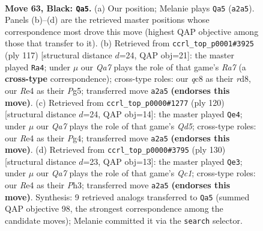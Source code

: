\documentclass[11pt]{article}
\begin{document}
\clearpage

\begin{figure}[p]\centering
\begin{subfigure}{0.46\textwidth}\centering
\resizebox{\linewidth}{!}{%
\newchessgame
\chessboard[
  setfen={2Q5/8/5pk1/3p4/4r3/6PK/q6P/8 b - - 7 63},
  showmover=false,
  pgfstyle=straightmove, color=movearrow, markmove={a2-a5}
]}
\caption{}
\end{subfigure}\hfill
\begin{subfigure}{0.46\textwidth}\centering
\resizebox{\linewidth}{!}{%
\newchessgame
\chessboard[
  setfen={3R4/8/6k1/p5p1/8/5PK1/r5P1/8 b - - 21 59},
  showmover=false,
  pgfstyle=straightmove, color=movearrow, markmove={a2-a4}
]}
\caption{}
\end{subfigure}
\\[4pt]
\begin{subfigure}{0.46\textwidth}\centering
\resizebox{\linewidth}{!}{%
\newchessgame
\chessboard[
  setfen={8/2q3k1/7p/p2Q2p1/6P1/5P1K/8/8 w - - 4 61},
  showmover=false,
  pgfstyle=straightmove, color=movearrow, markmove={d5-e4}
]}
\caption{}
\end{subfigure}\hfill
\begin{subfigure}{0.46\textwidth}\centering
\resizebox{\linewidth}{!}{%
\newchessgame
\chessboard[
  setfen={8/8/5qk1/6p1/7p/7P/6P1/2Q4K w - - 12 66},
  showmover=false,
  pgfstyle=straightmove, color=movearrow, markmove={c1-e3}
]}
\caption{}
\end{subfigure}
\caption{\textbf{Move 63, Black: \texttt{Qa5}.} (a) Our position; Melanie plays \texttt{Qa5} (\texttt{a2a5}). Panels (b)--(d) are the retrieved master positions whose correspondence most drove this move (highest QAP objective among those that transfer to it). (b) Retrieved from \texttt{ccrl\_top\_p0001\#3925} (ply 117) [structural distance $d$=24, QAP obj=21]: the master played \texttt{Ra4}; under $\mu$ our \emph{Qa7} plays the role of that game's \emph{Ra7} (a \textbf{cross-type} correspondence); cross-type roles: our \emph{q}c8 as their \emph{r}d8, our \emph{R}e4 as their \emph{P}g5; transferred move \texttt{a2a5} \textbf{(endorses this move)}. (c) Retrieved from \texttt{ccrl\_top\_p0000\#1277} (ply 120) [structural distance $d$=24, QAP obj=14]: the master played \texttt{Qe4}; under $\mu$ our \emph{Qa7} plays the role of that game's \emph{Qd5}; cross-type roles: our \emph{R}e4 as their \emph{P}g4; transferred move \texttt{a2a5} \textbf{(endorses this move)}. (d) Retrieved from \texttt{ccrl\_top\_p0000\#3795} (ply 130) [structural distance $d$=23, QAP obj=13]: the master played \texttt{Qe3}; under $\mu$ our \emph{Qa7} plays the role of that game's \emph{Qc1}; cross-type roles: our \emph{R}e4 as their \emph{P}h3; transferred move \texttt{a2a5} \textbf{(endorses this move)}. Synthesis: 9 retrieved analogs transferred to \texttt{Qa5} (summed QAP objective 98, the strongest correspondence among the candidate moves); Melanie committed it via the \texttt{search} selector.}
\label{fig:thought-m125}
\end{figure}
\end{document}
